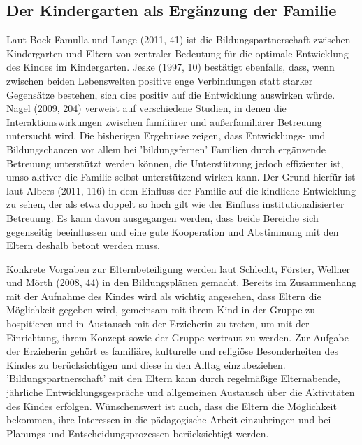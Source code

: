 \subsection{Der Kindergarten als Ergänzung der Familie}
Laut Bock-Famulla und Lange (2011, 41) ist die Bildungspartnerschaft zwischen Kindergarten und Eltern von zentraler Bedeutung für die optimale Entwicklung des Kindes im Kindergarten. Jeske (1997, 10) bestätigt ebenfalls, dass, wenn zwischen beiden Lebenswelten positive enge Verbindungen statt starker Gegensätze bestehen, sich dies positiv auf die Entwicklung auswirken würde. Nagel (2009, 204) verweist auf verschiedene Studien, in denen die Interaktionswirkungen zwischen familiärer und außerfamiliärer Betreuung untersucht wird. Die bisherigen Ergebnisse zeigen, dass Entwicklungs- und Bildungschancen vor allem bei ’bildungsfernen’ Familien durch ergänzende Betreuung unterstützt werden können, die Unterstützung jedoch effizienter ist, umso aktiver die Familie selbst unterstützend wirken kann. Der Grund hierfür ist laut Albers (2011, 116) in dem Einfluss der Familie auf die kindliche Entwicklung zu sehen, der als etwa doppelt so hoch gilt wie der Einfluss institutionalisierter Betreuung. Es kann davon ausgegangen werden, dass beide Bereiche sich gegenseitig beeinflussen und eine gute Kooperation und Abstimmung mit den Eltern deshalb betont werden muss. 

Konkrete Vorgaben zur Elternbeteiligung werden laut Schlecht, Förster, Wellner und Mörth (2008, 44) in den Bildungsplänen gemacht. Bereits im Zusammenhang mit der Aufnahme des Kindes wird als wichtig angesehen, dass Eltern die Möglichkeit gegeben wird, gemeinsam mit ihrem Kind in der Gruppe zu hospitieren und in Austausch mit der Erzieherin zu treten, um mit der Einrichtung, ihrem Konzept sowie der Gruppe vertraut zu werden. Zur Aufgabe der Erzieherin gehört es familiäre, kulturelle und religiöse Besonderheiten des Kindes zu berücksichtigen und diese in den Alltag einzubeziehen. 'Bildungspartnerschaft' mit den Eltern kann durch regelmäßige Elternabende, jährliche Entwicklungsgespräche und allgemeinen Austausch über die Aktivitäten des Kindes erfolgen. Wünschenswert ist auch, dass die Eltern die Möglichkeit bekommen, ihre Interessen in die pädagogische Arbeit einzubringen und bei Planungs\- und Entscheidungsprozessen berücksichtigt werden.

